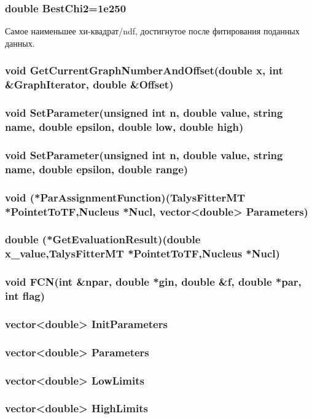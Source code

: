 \documentclass[a4paper,12pt]{extarticle}
\begin{document}
\subsubsection{double BestChi2=1e250}
Самое наименьшее хи-квадрат/ndf, достигнутое после фитирования поданных данных.
\subsubsection{void GetCurrentGraphNumberAndOffset(double x, int \textbf{\&}GraphIterator, double \textbf{\&}Offset)}
\subsubsection{void SetParameter(unsigned int n, double value, string name, double epsilon, double low, double high)}
\subsubsection{void SetParameter(unsigned int n, double value, string name, double epsilon, double range)}
\subsubsection{void (*ParAssignmentFunction)(TalysFitterMT *PointetToTF,Nucleus *Nucl, vector<double> Parameters)}
\subsubsection{double (*GetEvaluationResult)(double x_value,TalysFitterMT *PointetToTF,Nucleus *Nucl)}
\subsubsection{void FCN(int \textbf{\&}npar, double *gin, double \textbf{\&}f, double *par, int flag)}
\subsubsection{vector<double> InitParameters}
\subsubsection{vector<double> Parameters}
\subsubsection{vector<double> LowLimits}
\subsubsection{vector<double> HighLimits}
\end{document}

